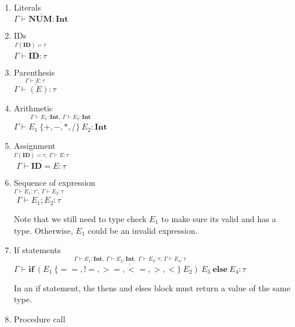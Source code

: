 \documentclass[12pt, letterpaper]{article}
\begin{document}
\begin{enumerate}
\item Literals\\

$\overline{\Gamma \vdash \textbf{NUM}: \textbf{Int}}$

\item IDs\\

$\overset{\displaystyle \Gamma(\textbf{ID}) = \tau}{\overline{\Gamma \vdash \textbf{ID}: \tau}}$

\item Parenthesis\\

$\overset{\displaystyle \Gamma \vdash E: \tau}{\overline{\Gamma \vdash (E): \tau}}$

\item Arithmetic\\

$\overset{\displaystyle \Gamma \vdash E_1: \textbf{Int}, \ \Gamma \vdash E_2: \textbf{Int}}{\overline{\Gamma \vdash E_1 \ \{+, -, *, /\} \ E_2: \textbf{Int}}}$

\item Assignment\\

$\overset{\underline{\displaystyle \Gamma(\textbf{ID}) = \tau, \ \Gamma \vdash E: \tau}}{\Gamma \vdash \textbf{ID} = E: \tau}$

\item Sequence of expression\\

$\overset{\underline{\displaystyle \Gamma \vdash E_1: \tau', \ \Gamma \vdash E_2: \tau}}{\Gamma \vdash E_1; E_2: \tau}$

Note that we still need to type check \(E_1\) to make sure its valid and has a type. Otherwise, \(E_1\) could be an invalid expression.

\item If statements\\

$\overset{\displaystyle \Gamma \vdash E_1: \textbf{Int}, \ \Gamma \vdash E_2: \textbf{Int}, \ \Gamma \vdash E_3: \tau, \ \Gamma \vdash E_4: \tau}{\overline{\Gamma \vdash \textbf{if} \ (E_1 \ \{==, !=, >=, <=, >, <\} \ E_2)\ E_3 \ \textbf{else} \ E_4: \tau}}$

In an if statement, the thens and elses block must return a value of the same type.

\item Procedure call\\


\end{enumerate}
\end{document}
